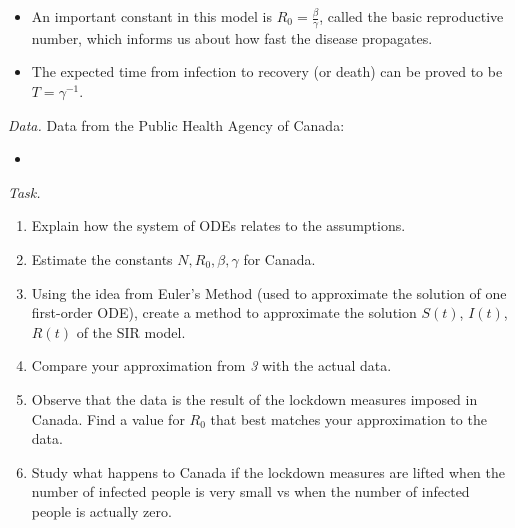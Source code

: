 \begin{important}
\begin{itemize}
\item An important constant in this model is $R_0 = \frac{\beta}{\gamma}$, called the basic reproductive number, which informs us about how fast the disease propagates.
\item The expected time from infection to recovery (or death) can be proved to be $T = \gamma^{-1}$.
\end{itemize}
\end{important}



\newpage

\begin{graybox}
\emph{Data. } Data from the Public Health Agency of Canada:
\begin{itemize}
	\item {}
\end{itemize}
\end{graybox}


\vspace{1cm}

\emph{Task. } 

\begin{enumerate}[label=\emph{\arabic*.}]
\item Explain how the system of ODEs relates to the assumptions.
\item Estimate the constants $N, R_0, \beta, \gamma$ for Canada.
\item Using the idea from Euler's Method (used to approximate the solution of one first-order ODE), create a method to approximate the solution $S(t)$, $I(t)$, $R(t)$ of the SIR model.
\item Compare your approximation from \emph{3} with the actual data.
\item Observe that the data is the result of the lockdown measures imposed in Canada. Find a value for $R_0$ that best matches your approximation to the data.
\item Study what happens to Canada if the lockdown measures are lifted when the number of infected people is very small vs when the number of infected people is actually zero.
\end{enumerate}




\vfill


